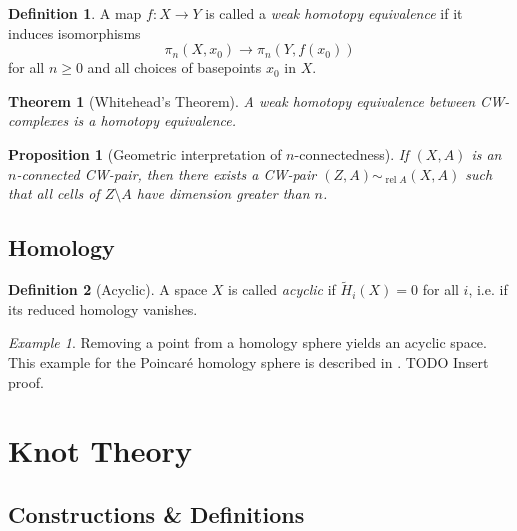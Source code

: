 \documentclass[nobib]{tufte-book} %
\newtheorem{theorem}{Theorem}
\newtheorem{proposition}{Proposition}
\theoremstyle{definition}
\newtheorem{definition}{Definition}
\theoremstyle{remark}
\newtheorem{example}{Example}
\DeclareMathOperator{\rel}{rel}
\begin{document}
\begin{definition}
	A map $f \colon X \rightarrow Y$ is called a
	\textit{weak homotopy equivalence} 
	if it induces isomorphisms
	\[
	\pi_n(X, x_0) \rightarrow \pi_n(Y, f(x_0))
	\]
	for all $n \ge 0$ and all choices of basepoints $x_0$ in $X$.
\end{definition}

\begin{theorem}[Whitehead's Theorem]
	A weak homotopy equivalence between CW-complexes is a homotopy equivalence.
\end{theorem}

\begin{proposition}[Geometric interpretation of $n$-connectedness]
	If $(X, A)$ is an $n$-connected CW-pair, then there exists
	a CW-pair $(Z, A) \sim_{\rel A} (X, A)$
	such that all cells of $Z \setminus A$ have dimension greater than $n$.
\end{proposition}

\section{Homology}

\begin{definition}[Acyclic]
	A space $X$ is called \textit{acyclic} if $\widetilde{H}_{i}(X) = 0$ for all $i$,
	i.e. if its reduced homology vanishes.
\end{definition}

\begin{example}
	Removing a point from a homology sphere yields an acyclic space.
	This example for the Poincar\'e homology sphere is described in
	\citep[Example 2.38]{hatcher2002algebraic}.
	TODO Insert proof. %
\end{example}

\chapter{Knot Theory}

\section{Constructions \& Definitions}
\end{document}
